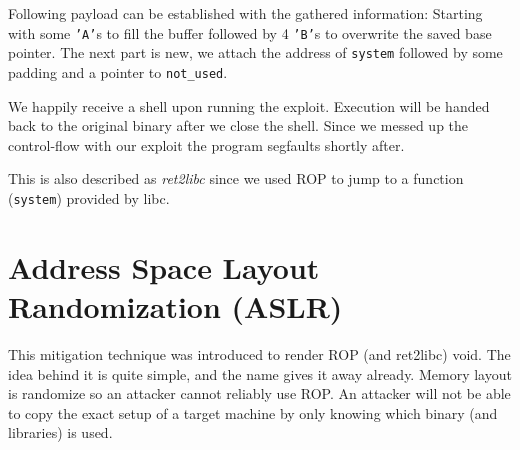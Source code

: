 \documentclass[article]{uibk}
\begin{document}
Following payload can be established with the gathered information: Starting
with some \texttt{'A'}s to fill the buffer followed by 4 \texttt{'B'}s to
overwrite the saved base pointer. The next part is new, we attach the address
of \texttt{system} followed by some padding and a pointer to
\texttt{not\_used}.

We happily receive a shell upon running the exploit. Execution will be handed
back to the original binary after we close the shell. Since we messed up the
control-flow with our exploit the program segfaults shortly after.

This is also described as \textit{ret2libc} since we used ROP to jump to a
function (\texttt{system}) provided by libc.

\section{Address Space Layout Randomization (ASLR)}

This mitigation technique was introduced to render ROP (and ret2libc) void. The
idea behind it is quite simple, and the name gives it away already. Memory
layout is randomize so an attacker cannot reliably use ROP. An attacker will
not be able to copy the exact setup of a target machine by only knowing which
binary (and libraries) is used.
\end{document}
